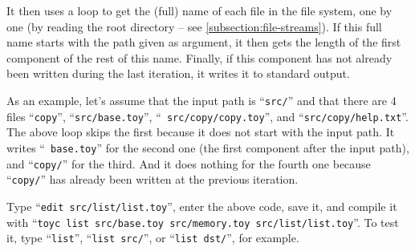 It then uses a loop to get the (full) name of each file in the file system, one
by one (by reading the root directory -- see \cref{subsection:file-streams}).
If this full name starts with the path given as argument, it then gets the
length of the first component of the rest of this name. Finally, if this
component has not already been written during the last iteration, it writes it
to standard output.

As an example, let's assume that the input path is ``{\tt src/}'' and that
there are 4 files ``{\tt copy}'', ``{\tt src/base.toy}'', ``{\tt
src/copy/copy.toy}'', and ``{\tt src/copy/help.txt}''. The above loop skips the
first because it does not start with the input path. It writes ``{\tt
base.toy}'' for the second one (the first component after the input path), and
``{\tt copy/}'' for the third. And it does nothing for the fourth one because
``{\tt copy/}'' has already been written at the previous iteration.


Type ``{\tt edit src/list/list.toy}'', enter the above code, save it, and
compile it with ``{\tt toyc list src/base.toy src/memory.toy
src/list/list.toy}''. To test it, type ``{\tt list}'', ``{\tt list src/}'', or
``{\tt list dst/}'', for example.

